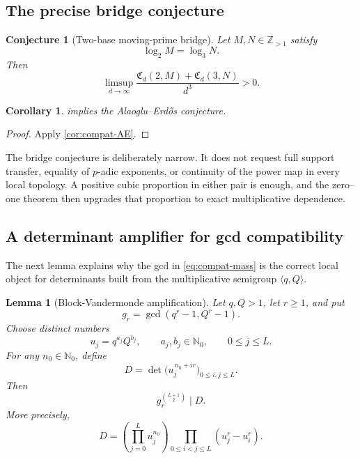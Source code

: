 \documentclass[11pt]{article}
\newtheorem{lemma}[theorem]{Lemma}
\newtheorem{corollary}[theorem]{Corollary}
\newtheorem{conjecture}[theorem]{Conjecture}
\theoremstyle{definition}
\theoremstyle{remark}
\newcommand{\N}{\mathbb N}
\newcommand{\Z}{\mathbb Z}
\newcommand{\AEname}{Alaoglu--Erd\H{o}s}
\begin{document}
\subsection{The precise bridge conjecture}

\begin{conjecture}[Two-base moving-prime bridge]\label{conj:MP-bridge}
Let $M,N\in\Z_{>1}$ satisfy
\[
 \log_2 M=\log_3 N.
\]
Then
\[
 \limsup_{d\to\infty}
 \frac{\mathfrak C_d(2,M)+\mathfrak C_d(3,N)}{d^3}>0.
\]
\end{conjecture}

\begin{corollary}
 implies the \AEname{} conjecture.
\end{corollary}

\begin{proof}
Apply \cref{cor:compat-AE}.
\end{proof}

The bridge conjecture is deliberately narrow.  It does not request full
support transfer, equality of $p$-adic exponents, or continuity of the power
map in every local topology.  A positive cubic proportion in either pair is
enough, and the zero--one theorem then upgrades that proportion to exact
multiplicative dependence.

\subsection{A determinant amplifier for gcd compatibility}

The next lemma explains why the gcd in \eqref{eq:compat-mass} is the correct
local object for determinants built from the multiplicative semigroup
$\langle q,Q\rangle$.

\begin{lemma}[Block-Vandermonde amplification]\label{lem:block-V}
Let $q,Q>1$, let $r\geq1$, and put
\[
 g_r=\gcd(q^r-1,Q^r-1).
\]
Choose distinct numbers
\[
 u_j=q^{a_j}Q^{b_j},\qquad a_j,b_j\in\N_0,
 \qquad 0\leq j\leq L.
\]
For any $n_0\in\N_0$, define
\[
 D=\det\bigl(u_j^{\,n_0+ir}\bigr)_{0\leq i,j\leq L}.
\]
Then
\begin{equation}\label{eq:block-divisibility}
 g_r^{\binom{L+1}{2}}\mid D.
\end{equation}
More precisely,
\begin{equation}\label{eq:block-factorization}
 D=\left(\prod_{j=0}^{L}u_j^{n_0}\right)
   \prod_{0\leq i<j\leq L}(u_j^r-u_i^r).
\end{equation}
\end{lemma}
\end{document}
